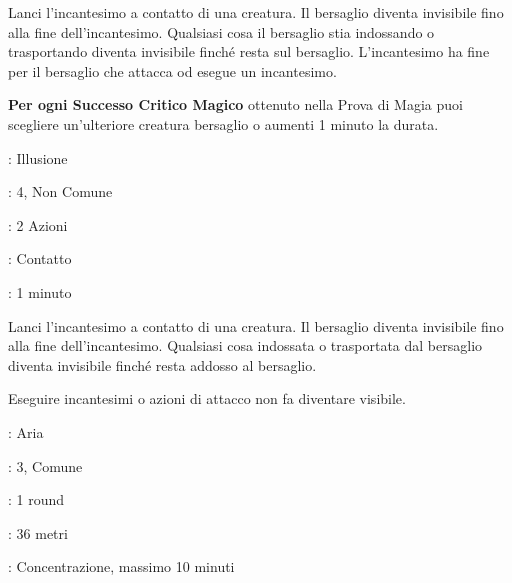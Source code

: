\begin{multicols}{2}
Lanci l'incantesimo a contatto di una creatura. Il bersaglio diventa invisibile fino alla fine dell'incantesimo. Qualsiasi cosa il bersaglio stia indossando o trasportando diventa invisibile finché resta sul bersaglio. L'incantesimo ha fine per il bersaglio che attacca od esegue un incantesimo.

\textbf{Per ogni Successo Critico Magico} ottenuto nella Prova di Magia puoi scegliere un'ulteriore creatura bersaglio o aumenti 1 minuto la durata.

\noindent\colorbox{OBSSgold!10}{
\begin{minipage}{0.95\linewidth}
\begin{description}[noitemsep, topsep=0pt, parsep=0pt, partopsep=0pt, leftmargin=0cm, labelwidth=1.3cm]
	\item[\textbf{Lista}]: Illusione
	\item[\textbf{Livello}]: 4, Non Comune
	\item[\textbf{Lancio}]: 2 Azioni
	\item[\textbf{Gittata}]: Contatto
	\item[\textbf{Durata}]: 1 minuto
\end{description}
\end{minipage}}\smallskip

Lanci l'incantesimo a contatto di una creatura. Il bersaglio diventa invisibile fino alla fine dell'incantesimo. Qualsiasi cosa indossata o trasportata dal bersaglio diventa invisibile finché resta addosso al bersaglio.

Eseguire incantesimi o azioni di attacco non fa diventare visibile.

\noindent\colorbox{OBSSgold!10}{
\begin{minipage}{0.95\linewidth}
\begin{description}[noitemsep, topsep=0pt, parsep=0pt, partopsep=0pt, leftmargin=0cm, labelwidth=1.3cm]
	\item[\textbf{Lista}]: Aria
	\item[\textbf{Livello}]: 3, Comune
	\item[\textbf{Lancio}]: 1 round
	\item[\textbf{Gittata}]: 36 metri
	\item[\textbf{Durata}]: Concentrazione, massimo 10 minuti
\end{description}
\end{minipage}}\smallskip


\end{multicols}
